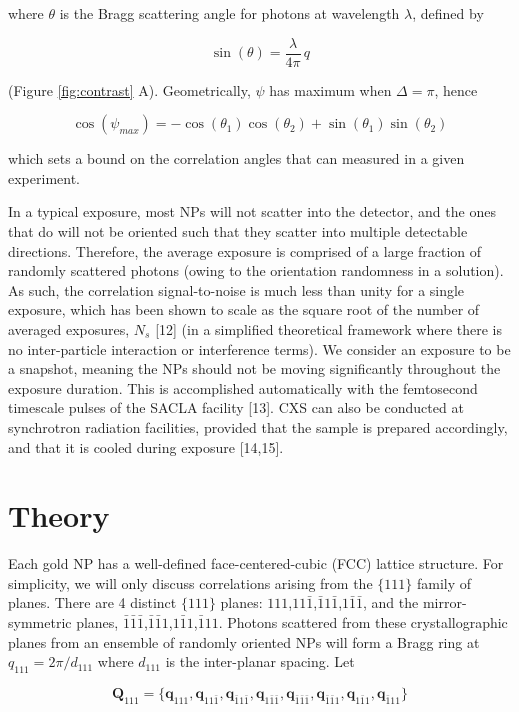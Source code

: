 \documentclass [11pt,fleqn]{article}
\def \be {\begin{equation}}
\def \ee {\end{equation}}
\begin{document}
where $\theta$ is the Bragg scattering angle for photons at wavelength $\lambda$, defined by

\be
\sin (\theta)   = \frac{ \lambda  }{ 4\pi } \, q
\ee

(Figure \ref{fig:contrast} A). Geometrically, $\psi$ has maximum when $\Delta=\pi$, hence

\be \label{psimax}
\cos(\psi_{max}) = - \cos( \theta_1)\cos(\theta_2) + \sin(\theta_1)\sin(\theta_2)
\ee

which sets a bound on the correlation angles that can measured in a given experiment. 

In a typical exposure, most NPs will not scatter into the detector, and the ones that do will not be oriented such that they scatter into multiple detectable directions. Therefore, the average exposure is comprised of a large fraction of randomly scattered photons (owing to the orientation randomness in a solution). As such, the correlation signal-to-noise is much less than unity for a single exposure, which has been shown to scale as the square root of the number of averaged exposures, $N_s$ [12]  (in a simplified theoretical framework where there is no inter-particle interaction or interference terms). We consider an exposure to be a snapshot, meaning the NPs should not be moving significantly throughout the exposure duration. This is accomplished automatically with the femtosecond timescale pulses of the SACLA facility [13].  CXS can also be conducted at synchrotron radiation facilities, provided  that the sample is prepared accordingly, and that it is cooled during exposure [14,15]. 

\section{Theory}
Each gold NP has a well-defined face-centered-cubic (FCC) lattice structure. For simplicity, we will only discuss correlations arising from the $\{111\}$ family of planes. There are 4 distinct $\{111\}$ planes: $111$,$11\bar 1$,$\bar 1 1\bar 1$,$1\bar 1 \bar 1$, and the mirror-symmetric planes, $\bar 1\bar 1\bar 1$,$\bar 1\bar 1 1$,$1 \bar 11$,$\bar 1 1 1$.  Photons scattered from these crystallographic planes from an ensemble of randomly oriented NPs will form a Bragg ring at  $q_{111} = 2\pi / d_{111} $ where $d_{111}$ is the inter-planar spacing. Let 

\be
\bm Q_{111} = \{\bm q_{111}, \bm q_{11\bar 1},\bm q_{\bar 1 1\bar 1},\bm q_{1\bar 1 \bar 1},\bm q_{\bar 1\bar 1\bar 1},\bm q_{\bar 1\bar 1 1},\bm q_{1 \bar 11},\bm q_{\bar 1 1 1}\}
\ee
\end{document}
